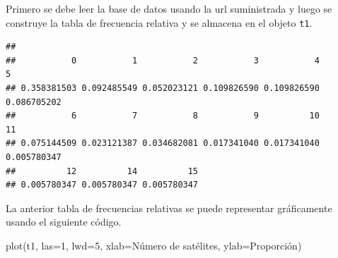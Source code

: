 \documentclass[
]{book}
\makeatletter
\newenvironment{Shaded}{\begin{snugshade}}{\end{snugshade}}
\newcommand{\AttributeTok}[1]{\textcolor[rgb]{0.77,0.63,0.00}{#1}}
\newcommand{\DecValTok}[1]{\textcolor[rgb]{0.00,0.00,0.81}{#1}}
\newcommand{\FunctionTok}[1]{\textcolor[rgb]{0.00,0.00,0.00}{#1}}
\newcommand{\NormalTok}[1]{#1}
\newcommand{\OtherTok}[1]{\textcolor[rgb]{0.56,0.35,0.01}{#1}}
\newcommand{\SpecialCharTok}[1]{\textcolor[rgb]{0.00,0.00,0.00}{#1}}
\newcommand{\StringTok}[1]{\textcolor[rgb]{0.31,0.60,0.02}{#1}}
\newenvironment{kframe}{%
\medskip{}
\setlength{\fboxsep}{.8em}
 \def\at@end@of@kframe{}%
 \ifinner\ifhmode%
  \def\at@end@of@kframe{\end{minipage}}%
  \begin{minipage}{\columnwidth}%
 \fi\fi%
 \def\FrameCommand##1{\hskip\@totalleftmargin \hskip-\fboxsep
 \colorbox{shadecolor}{##1}\hskip-\fboxsep
     \hskip-\linewidth \hskip-\@totalleftmargin \hskip\columnwidth}%
 \MakeFramed {\advance\hsize-\width
   \@totalleftmargin\z@ \linewidth\hsize
   \@setminipage}}%
 {\par\unskip\endMakeFramed%
 \at@end@of@kframe}
\renewenvironment{Shaded}{\begin{kframe}}{\end{kframe}}
\makeatother
\begin{document}
Primero se debe leer la base de datos usando la url suministrada y luego se construye la tabla de frecuencia relativa y se almacena en el objeto \texttt{t1}.

\begin{Shaded}
\end{Shaded}

\begin{verbatim}
## 
##           0           1           2           3           4           5 
## 0.358381503 0.092485549 0.052023121 0.109826590 0.109826590 0.086705202 
##           6           7           8           9          10          11 
## 0.075144509 0.023121387 0.034682081 0.017341040 0.017341040 0.005780347 
##          12          14          15 
## 0.005780347 0.005780347 0.005780347
\end{verbatim}

La anterior tabla de frecuencias relativas se puede representar gráficamente usando el siguiente código.

\begin{Shaded}
\begin{Highlighting}[]
\FunctionTok{plot}\NormalTok{(t1, }\AttributeTok{las=}\DecValTok{1}\NormalTok{, }\AttributeTok{lwd=}\DecValTok{5}\NormalTok{, }\AttributeTok{xlab=}\StringTok{\textquotesingle{}Número de satélites\textquotesingle{}}\NormalTok{,}
     \AttributeTok{ylab=}\StringTok{\textquotesingle{}Proporción\textquotesingle{}}\NormalTok{)}
\end{Highlighting}
\end{Shaded}
\end{document}
